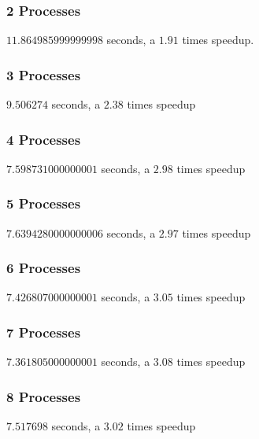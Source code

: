 \documentclass{article}
\begin{document}
\subsubsection*{2 Processes}
$11.864985999999998$ seconds, a $1.91$ times speedup.
\subsubsection*{3 Processes}
$9.506274$ seconds, a $2.38$ times speedup
\subsubsection*{4 Processes}
$7.598731000000001$ seconds, a $2.98$ times speedup
\subsubsection*{5 Processes}
$7.6394280000000006$ seconds, a $2.97$ times speedup
\subsubsection*{6 Processes}
$7.426807000000001$ seconds, a $3.05$ times speedup
\subsubsection*{7 Processes}
$7.361805000000001$ seconds, a $3.08$ times speedup
\subsubsection*{8 Processes}
$7.517698$ seconds, a $3.02$ times speedup
\end{document}
